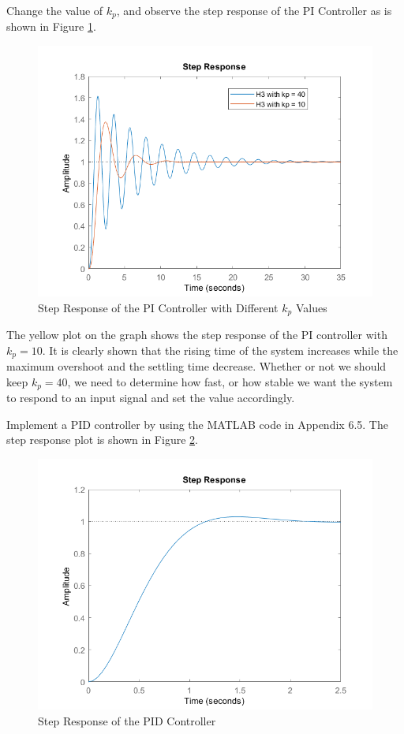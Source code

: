\documentclass[a4paper, twocolumn, titlepage, 10pt]{article}
\begin{document}
		Change the value of $k_p$, and observe the step response of the PI Controller as is shown in Figure \ref{StepPI_diffKp}. 
		\begin{figure}[H]
			\centering
			\includegraphics[width=\linewidth]{StepPI_diffKp}
			\caption{Step Response of the PI Controller with Different $k_p$ Values}
			\label{StepPI_diffKp}
		\end{figure}
	
		The yellow plot on the graph shows the step response of the PI controller with $k_p = 10$. It is clearly shown that the rising time of the system increases while the maximum overshoot and the settling time decrease. Whether or not we should keep $k_p=40$, we need to determine how fast, or how stable we want the system to respond to an input signal and set the value accordingly.
		
		Implement a PID controller by using the MATLAB code in Appendix 6.5. The step response plot is shown in Figure \ref{StepPID}.
		\begin{figure}[H]
			\centering
			\includegraphics[width=\linewidth]{StepPID}
			\caption{Step Response of the PID Controller}
			\label{StepPID}
		\end{figure}
	
\end{document}
